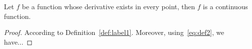 \begin{theorem}
	\label{th:1}
	Let $f$ be a function whose derivative exists in every point, then $f$ is a continuous function.
\end{theorem}
\begin{proof}
	According to Definition~\ref{def:label1}.
	Moreover, using~\eqref{eq:def2}, we have...
\end{proof}
